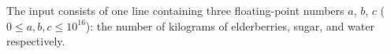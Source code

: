 

The input consists of one line containing three floating-point numbers $a$, $b$,
$c$ ($0 \le a, b, c \le 10^{16}$): the number of kilograms of elderberries, sugar,
and water respectively.
  
